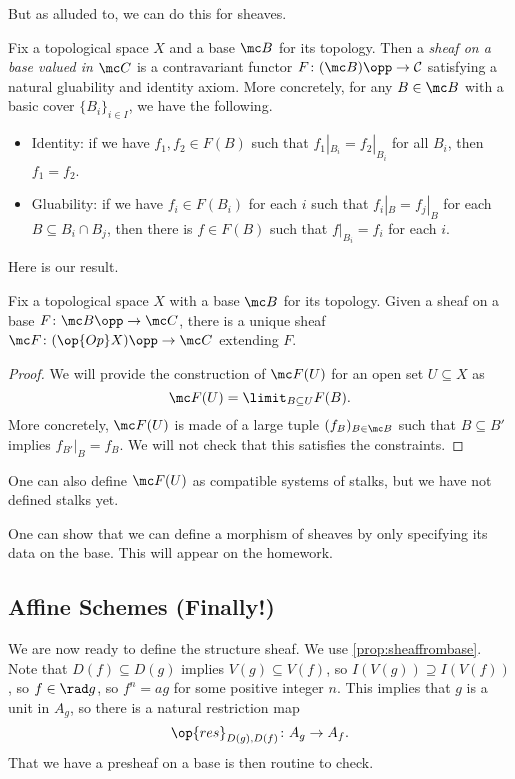 \documentclass[../notes.tex]{subfiles}
\begin{document}
But as alluded to, we can do this for sheaves.
\begin{definition}
	Fix a topological space $X$ and a base $\mc B$ for its topology. Then a \textit{sheaf on a base valued in $\mc C$} is a contravariant functor $F\colon(\mc B)\opp\to\mathcal C$ satisfying a natural gluability and identity axiom. More concretely, for any $B\in\mc B$ with a basic cover $\{B_i\}_{i\in I}$, we have the following.
	\begin{itemize}
		\item Identity: if we have $f_1,f_2\in F(B)$ such that $f_1|_{B_i}=f_2|_{B_i}$ for all $B_i$, then $f_1=f_2$.
		\item Gluability: if we have $f_i\in F(B_i)$ for each $i$ such that $f_i|_{B}=f_j|_{B}$ for each $B\subseteq B_i\cap B_j$, then there is $f\in F(B)$ such that $f|_{B_i}=f_i$ for each $i$.
	\end{itemize}
\end{definition}
Here is our result.
\begin{proposition} \label{prop:sheaffrombase}
	Fix a topological space $X$ with a base $\mc B$ for its topology. Given a sheaf on a base $F\colon\mc B\opp\to\mc C$, there is a unique sheaf $\mc F\colon(\op{Op}X)\opp\to\mc C$ extending $F$.
\end{proposition}
\begin{proof}
	We will provide the construction of $\mc F(U)$ for an open set $U\subseteq X$ as
	\[\mc F(U)=\limit_{B\subseteq U}F(B).\]
	More concretely, $\mc F(U)$ is made of a large tuple $(f_B)_{B\in\mc B}$ such that $B\subseteq B'$ implies $f_{B'}|_B=f_B$. We will not check that this satisfies the constraints.
\end{proof}
\begin{remark}
	One can also define $\mc F(U)$ as compatible systems of stalks, but we have not defined stalks yet.
\end{remark}
\begin{remark}
	One can show that we can define a morphism of sheaves by only specifying its data on the base. This will appear on the homework.
\end{remark}

\subsection{Affine Schemes (Finally!)}
We are now ready to define the structure sheaf.  We use \autoref{prop:sheaffrombase}. Note that $D(f)\subseteq D(g)$ implies $V(g)\subseteq V(f)$, so $I(V(g))\supseteq I(V(f))$, so $f\in\rad g$, so $f^n=ag$ for some positive integer $n$. This implies that $g$ is a unit in $A_g$, so there is a natural restriction map
\[\op{res}_{D(g),D(f)}\colon A_g\to A_f.\]
That we have a presheaf on a base is then routine to check.
\end{document}
